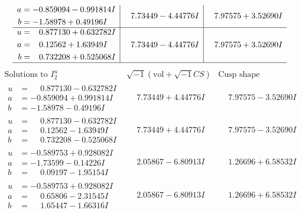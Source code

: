\documentclass[1p]{elsarticle_modified}
\theoremstyle{definition}
\newcommand{\I}{\sqrt{-1}}
\begin{document}
$$\begin{array}{c|c|c}
\begin{aligned}
a &= -0.859094 - 0.991814 I \\
b &= -1.58978 + 0.49196 I\end{aligned}
 & \phantom{-}7.73449 - 4.44776 I & \phantom{-}7.97575 + 3.52690 I \\ \hline\begin{aligned}
u &= \phantom{-}0.877130 + 0.632782 I \\
a &= \phantom{-}0.12562 + 1.63949 I \\
b &= \phantom{-}0.732208 + 0.525068 I\end{aligned}
 & \phantom{-}7.73449 - 4.44776 I & \phantom{-}7.97575 + 3.52690 I\\
 \hline 
 \end{array}$$\newpage$$\begin{array}{c|c|c}  
\text{Solutions to }I^u_{2}& \I (\text{vol} + \sqrt{-1}CS) & \text{Cusp shape}\\
 \hline 
\begin{aligned}
u &= \phantom{-}0.877130 - 0.632782 I \\
a &= -0.859094 + 0.991814 I \\
b &= -1.58978 - 0.49196 I\end{aligned}
 & \phantom{-}7.73449 + 4.44776 I & \phantom{-}7.97575 - 3.52690 I \\ \hline\begin{aligned}
u &= \phantom{-}0.877130 - 0.632782 I \\
a &= \phantom{-}0.12562 - 1.63949 I \\
b &= \phantom{-}0.732208 - 0.525068 I\end{aligned}
 & \phantom{-}7.73449 + 4.44776 I & \phantom{-}7.97575 - 3.52690 I \\ \hline\begin{aligned}
u &= -0.589753 + 0.928082 I \\
a &= -1.73599 - 0.14226 I \\
b &= \phantom{-}0.09197 - 1.95154 I\end{aligned}
 & \phantom{-}2.05867 - 6.80913 I & \phantom{-}1.26696 + 6.58532 I \\ \hline\begin{aligned}
u &= -0.589753 + 0.928082 I \\
a &= \phantom{-}0.65806 - 2.31545 I \\
b &= \phantom{-}1.65447 - 1.66316 I\end{aligned}
 & \phantom{-}2.05867 - 6.80913 I & \phantom{-}1.26696 + 6.58532 I \\ \hline\begin{aligned}

\end{aligned}
\end{array}$$
\end{document}
